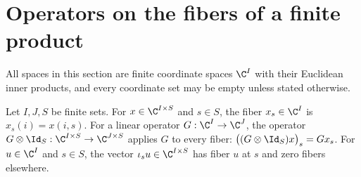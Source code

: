 \section{Operators on the fibers of a finite product}
\label{sec:perturbations_fibers}

All spaces in this section are finite coordinate spaces $\C^I$ with their
Euclidean inner products, and every coordinate set may be empty unless stated
otherwise.

\begin{definition}
    \label{def:euclidean_fiberwise_operator}
    \leanok
    Let $I,J,S$ be finite sets. For $x\in\C^{I\times S}$ and $s\in S$, the
    fiber $x_s\in\C^I$ is $x_s(i)=x(i,s)$. For a linear operator
    $G:\C^I\to\C^J$, the operator $G\otimes\Id_S:\C^{I\times S}\to\C^{J\times S}$
    applies $G$ to every fiber: $\bigl((G\otimes\Id_S)x\bigr)_s=Gx_s$. For
    $u\in\C^I$ and $s\in S$, the vector $\iota_su\in\C^{I\times S}$ has fiber
    $u$ at $s$ and zero fibers elsewhere.
\end{definition}

